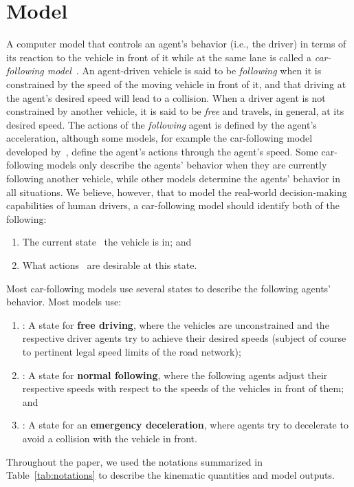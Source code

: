 \documentclass[preprint]{./acm_proc_article-sp}
\begin{document}
\section{Model}

A computer model that controls an agent's behavior (i.e., the driver) in terms of its reaction to the vehicle in front of it while at the same lane is called a {\em car-following model}~\citep{herman63}. An agent-driven vehicle is said to be {\em following} when it is constrained by the speed of the moving vehicle in front of it, and that driving at the agent's desired speed will lead to a collision. When a driver agent is not constrained by another vehicle, it is said to be {\em free} and travels, in general, at its desired speed. The actions of the {\em following} agent is defined by the agent's acceleration, although some models, for example the car-following model developed by~\citet{gipps81}, define the agent's actions through the agent's speed. Some car-following models only describe the agents' behavior when they are currently following another vehicle, while other models determine the agents' behavior in all situations. We believe, however, that to model the real-world decision-making capabilities of human drivers, a car-following model should identify both of the following:
\begin{enumerate}
\item The current state~ the vehicle is in; and
\item What actions~ are desirable at this state.
\end{enumerate}
Most car-following models use several states to describe the following agents' behavior. Most models use:
\begin{enumerate}
\item : A state for {\bf free driving}, where the vehicles are unconstrained and the respective driver agents try to achieve their desired speeds (subject of course to pertinent legal speed limits of the road network);
\item : A state for {\bf normal following}, where the following agents adjust their respective speeds with respect to the speeds of the vehicles in front of them; and
\item : A state for an {\bf emergency deceleration}, where agents try to decelerate to avoid a collision with the vehicle in front.
\end{enumerate} 

Throughout the paper, we used the notations summarized in Table~\ref{tab:notations} to describe the kinematic quantities and model outputs.
\end{document}
